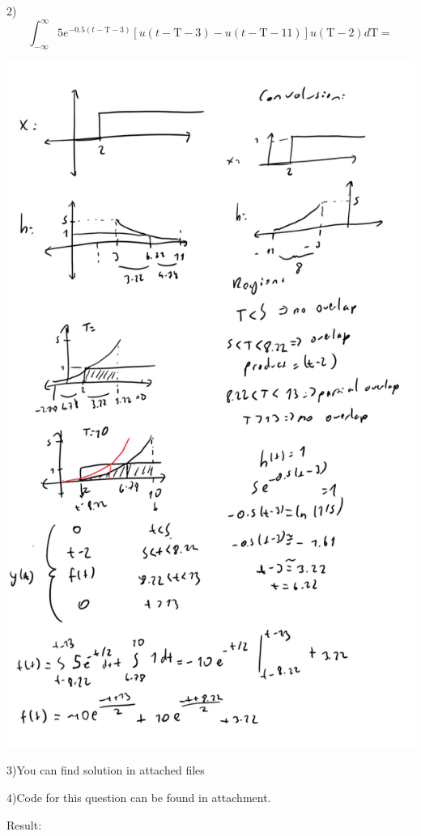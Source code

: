\documentclass{article}
\newcommand{\Tau}{\mathrm{T}}
\begin{document}
	2)
	$$\int_{-\infty}^{\infty}5e^{-0.5(t-\Tau-3)}[u(t-\Tau-3)-u(t-\Tau-11)] u(\Tau-2) d\Tau=$$\par
	\includegraphics[scale=0.7]{q2}	\par
	3)You can find solution in attached files
	\par
	4)Code for this question can be found in attachment.\par
	Result:\par
\end{document}
